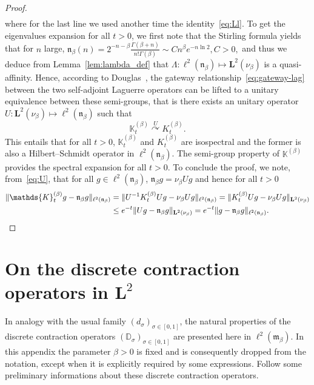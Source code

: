 \documentclass[AHL,Unicode,longabstracts]{cedram}
\newcommand{\fm}{\mathfrak{m}}
\newcommand{\fn}{\mathfrak{n}}
\newcommand{\dLs}{{\discret{K}}}
\newcommand{\Ls}{K}
\newcommand{\esL}{\mathbf{L}}
\newcommand{\esLd}{\ell}
\newcommand{\discret}[1]{\mathds{#1}}
\newcommand{\Ks}{\discret{K}}
\newcommand{\Gate}[3]{#1\stackrel{#2}{\curvearrowright}#3}
\begin{document}
\begin{proof}
\begin{align*}
\end{align*}
where for the last line we used another time the identity~\eqref{eq:Ll}. To get the eigenvalues expansion for all $t>0$, we first note that the Stirling formula yields that for $n$ large, $\fn_\beta(n)= 2^{-n-\beta}\frac{\Gamma(\beta+n)}{n!\Gamma(\beta)}\sim C n^{\beta} e^{-n \ln 2}, C>0,$ and thus we deduce from Lemma~\ref{lem:lambda_def} that $\Lambda : \ell^2({\fn_{\beta}}) \mapsto \esL^2(\nu_{\beta})$ is a quasi-affinity. Hence, according to Douglas~\cite{Douglas}, the gateway relationship~\eqref{eq:gateway-lag} between the two self-adjoint Laguerre operators can be lifted to a unitary equivalence between these semi-groups, that is there exists an unitary operator $U: \esL^2(\nu_{\beta})\mapsto \ell^2(\fn_{\beta})$ such that
\begin{equation}\label{eq:U}
\Gate{\dLs_{t}^{(\beta)}}{U}{\Ls_{t}^{(\beta)}}.
\end{equation}
This entails that for all $t>0$, $\Ks^{(\beta)}_t$ and $\Ls^{(\beta)}_t$ are isospectral and the former is also a Hilbert--Schmidt operator in $\esLd^2(\fn_{\beta})$. The semi-group property of $\Ks^{(\beta)}$ provides the spectral expansion for all $t>0$. To conclude the proof, we note, from~\eqref{eq:U}, that for all $ g \in \esLd^2(\fn_{\beta}) $, $\fn_{\beta} g=\nu_{\beta}U g$ and hence for all $t>0$
\begin{align*}
\|\Ks^{(\beta)}_tg-\fn_{\beta} g\|_{\ell^2(\fn_{\beta})} &= \|U^{-1}\Ls^{(\beta)}_tUg-\nu_{\beta}U g\|_{\ell^2(\fn_{\beta})} = \|\Ls^{(\beta)}_tUg-\nu_{\beta}U g\|_{\esL^2(\nu_{\beta})} \\
&\leq e^{-t} \|Ug-\fn_{\beta} g\|_{\esL^2(\nu_{\beta})} =e^{-t} \|g-\fn_{\beta} g\|_{\ell^2(\fn_{\beta})}.\qedhere
\end{align*}
\end{proof}


\appendix
\section{On the discrete contraction operators in \texorpdfstring{$\esL^2$}{L2}}\label{otdco}

In analogy with the usual family $(d_\sigma)_{\sigma\in[0,1]}$, the natural properties of the discrete contraction operators $(\discret{D}_\sigma)_{\sigma\in[0,1]}$ are presented here in $\esLd^2(\fm_{\beta})$. In this appendix the parameter $\beta>0$ is fixed and is consequently dropped from the notation, except when it is explicitly required by some expressions. Follow some preliminary informations about these discrete contraction operators.
\end{document}
